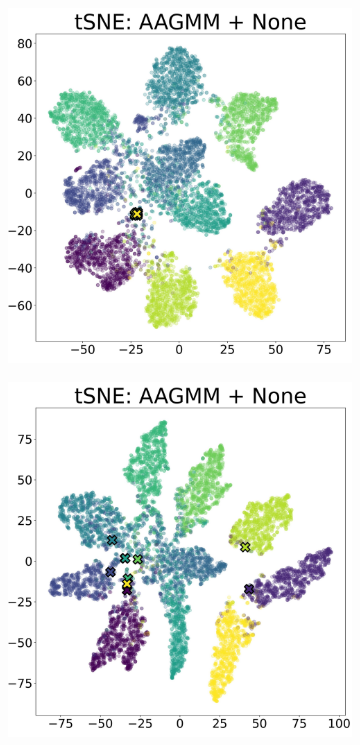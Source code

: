 \documentclass[10pt,twocolumn,letterpaper]{article}
\begin{document}
\begin{figure}[ht]
	\centering
	\begin{subfigure}[t]{.24\textwidth}
		\includegraphics[width=\textwidth]{figures/id-00000132-tsne.jpg}
		\subcaption{}
	\end{subfigure}
	\begin{subfigure}[t]{.24\textwidth}
		\includegraphics[width=\textwidth]{figures/id-00000020-tsne.jpg}

\end{subfigure}
\end{figure}
\end{document}
